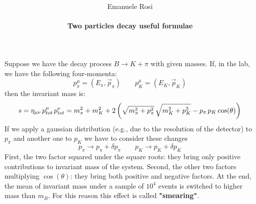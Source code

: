 \documentclass[11pt,a4paper]{article}
\begin{document}
\title{
}
\author{Emanuele Rosi\\\\
    \bf{Two particles decay useful formulae}}
\date{}
\maketitle

\noindent
Suppose we have the decay process $B \rightarrow K + \pi$ with given masses.
\newline
If, in the lab, we have the following four-momenta:
\begin{equation*}
    p_\pi^\mu = (E_\pi, \vec{p}_\pi) \qquad p_K^\mu = (E_K, \vec{p}_K)
\end{equation*}
\noindent
then the invariant mass is:
\begin{equation*}
    s = \eta_{\mu\nu} \hspace{0.5mm} p_{tot}^\mu \hspace{0.5mm} p_{tot}^\nu = m_\pi^2 + m_K^2 + 2\left( \sqrt{m_\pi^2 + p_\pi^2}\hspace{0.5mm}\sqrt{m_K^2 + p_K^2} - p_\pi \hspace{0.5mm} p_K\cos(\theta) \right)
\end{equation*}
\noindent
If we apply a gaussian distribution (e.g., due to the resolution of the detector) to $p_\pi$ and another one to $p_K$ we have to consider these changes
\begin{equation*}
    p_\pi \rightarrow p_\pi + \delta p_\pi \qquad p_K \rightarrow p_K + \delta p_K 
\end{equation*}
First, the two factor squared under the square roots: they bring only positive contributions to invariant mass of the system. Second, the other two factors multiplying $\cos(\theta)$: they bring both positive and negative factors.
At the end, the mean of invariant mass under a sample of $10^4$ events is switched to higher mass than $m_B$.
For this reason this effect is called {\bf "smearing"}.
\end{document}
